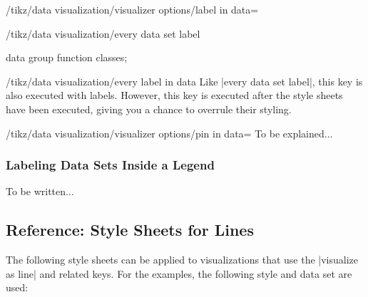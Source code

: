 \begin{key}{/tikz/data visualization/visualizer options/label in data=}
\begin{stylekey}{/tikz/data visualization/every data set label}
\begin{codeexample}[width=6.3cm]
\tikz \datavisualization [
  school book axes,
  x axis={label=$x$},
  visualize as smooth line/.list={log, lin, squared, exp},
  every data set label/.append style={text colored},
  log=    {label in data={text'=$\log x$, when=y is -1}},
  lin=    {label in data={text=$x/2$,     when=x is 2}},
  squared={label in data={text=$x^2$,     when=x is 1.1}},
  exp=    {label in data={text=$e^x$,     when=x is -2}},
  style sheet=vary hue]
data group {function classes};
\end{codeexample}
  \end{stylekey}
  
  \begin{stylekey}{/tikz/data visualization/every label in data}
    Like |every data set label|, this key is also executed with
    labels. However, this key is executed after the style sheets have
    been executed, giving you a chance to overrule their styling.
  \end{stylekey}
\end{key}


\begin{key}{/tikz/data visualization/visualizer options/pin in data=}
  To be explained...
\end{key}

\subsubsection{Labeling Data Sets Inside a Legend}


To be written...



\subsection{Reference: Style Sheets for Lines}

The following style sheets can be applied to visualizations that use
the |visualize as line| and related keys. For the examples, the
following style and data set are used:

